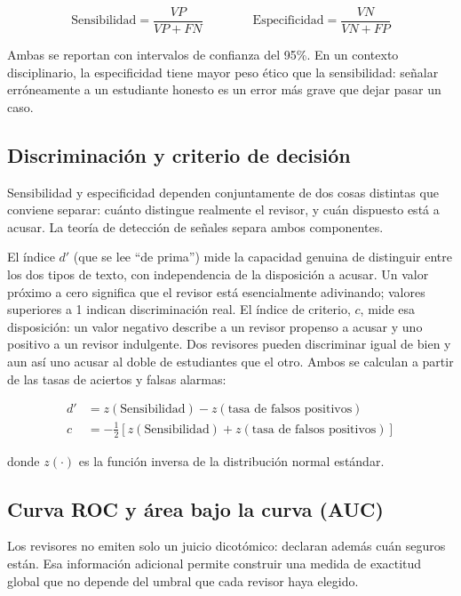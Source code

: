 \documentclass[12pt,a4paper,openany]{report}
\begin{document}
    \begin{equation}
        \text{Sensibilidad} = \frac{VP}{VP + FN}
        \qquad\qquad
        \text{Especificidad} = \frac{VN}{VN + FP}
    \end{equation}
    
    Ambas se reportan con intervalos de confianza del 95\%. En un contexto disciplinario, la especificidad tiene mayor peso \'etico que la sensibilidad: se\~nalar err\'oneamente a un estudiante honesto es un error m\'as grave que dejar pasar un caso.
    
    \subsection{Discriminaci\'on y criterio de decisi\'on}
    
    Sensibilidad y especificidad dependen conjuntamente de dos cosas distintas que conviene separar: cu\'anto distingue realmente el revisor, y cu\'an dispuesto est\'a a acusar. La teor\'ia de detecci\'on de se\~nales separa ambos componentes.
    
    El \'indice $d'$ (que se lee ``de prima'') mide la capacidad genuina de distinguir entre los dos tipos de texto, con independencia de la disposici\'on a acusar. Un valor pr\'oximo a cero significa que el revisor est\'a esencialmente adivinando; valores superiores a 1 indican discriminaci\'on real. El \'indice de criterio, $c$, mide esa disposici\'on: un valor negativo describe a un revisor propenso a acusar y uno positivo a un revisor indulgente. Dos revisores pueden discriminar igual de bien y aun as\'i uno acusar al doble de estudiantes que el otro. Ambos se calculan a partir de las tasas de aciertos y falsas alarmas:
    
    \begin{align}
        d' &= z(\text{Sensibilidad}) - z(\text{tasa de falsos positivos}) \\[2pt]
        c  &= -\tfrac{1}{2}\left[z(\text{Sensibilidad}) + z(\text{tasa de falsos positivos})\right]
    \end{align}
    
    donde $z(\cdot)$ es la funci\'on inversa de la distribuci\'on normal est\'andar.
    
    \subsection{Curva ROC y \'area bajo la curva (AUC)}
    
    Los revisores no emiten solo un juicio dicot\'omico: declaran adem\'as cu\'an seguros est\'an. Esa informaci\'on adicional permite construir una medida de exactitud global que no depende del umbral que cada revisor haya elegido.
    
\end{document}
